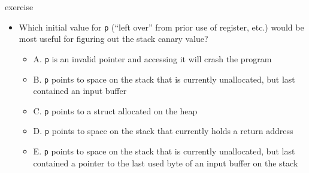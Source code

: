 \begin{frame}[fragile,label=infoDiscEx]{exercise}
\vspace{-.25cm}
\begin{itemize}
\item Which initial value for \texttt{p} (``left over'' from prior use of register, etc.) would be most useful for figuring out the stack canary value?
\begin{itemize}
\item A. \texttt{p} is an invalid pointer and accessing it will crash the program
\item B. \texttt{p} points to space on the stack that is currently unallocated, but last contained an input buffer
\item C. \texttt{p} points to a struct allocated on the heap
\item D. \texttt{p} points to space on the stack that currently holds a return address
\item E. \texttt{p} points to space on the stack that is currently unallocated, but last contained a pointer to the last used byte of an input buffer on the stack
\end{itemize}
\end{itemize}
\end{frame}
